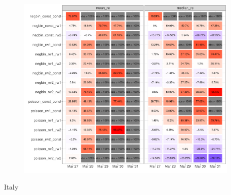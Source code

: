 \documentclass[usenames,dvipsnames]{beamer}
\begin{document}
\begin{frame}
\begin{figure}
 \begin{center}
  \includegraphics[height = 9cm]{figures/mdiff_hold_ireland.pdf}
 \end{center}
\end{figure}

\end{frame}

\begin{frame}
 Italy
\end{frame}

{
\begin{frame}[plain]
\end{frame}
}
\end{document}
